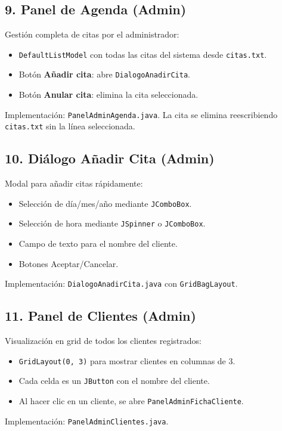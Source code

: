 \documentclass[12pt,a4paper]{report}
\begin{document}
\subsection{9. Panel de Agenda (Admin)}
Gestión completa de citas por el administrador:
\begin{itemize}
    \item \texttt{DefaultListModel} con todas las citas del sistema desde \texttt{citas.txt}.
    \item Botón \textbf{Añadir cita}: abre \texttt{DialogoAnadirCita}.
    \item Botón \textbf{Anular cita}: elimina la cita seleccionada.
\end{itemize}
Implementación: \texttt{PanelAdminAgenda.java}. La cita se elimina reescribiendo \texttt{citas.txt} sin la línea seleccionada.

\subsection{10. Diálogo Añadir Cita (Admin)}
Modal para añadir citas rápidamente:
\begin{itemize}
    \item Selección de día/mes/año mediante \texttt{JComboBox}.
    \item Selección de hora mediante \texttt{JSpinner} o \texttt{JComboBox}.
    \item Campo de texto para el nombre del cliente.
    \item Botones Aceptar/Cancelar.
\end{itemize}
Implementación: \texttt{DialogoAnadirCita.java} con \texttt{GridBagLayout}.

\subsection{11. Panel de Clientes (Admin)}
Visualización en grid de todos los clientes registrados:
\begin{itemize}
    \item \texttt{GridLayout(0, 3)} para mostrar clientes en columnas de 3.
    \item Cada celda es un \texttt{JButton} con el nombre del cliente.
    \item Al hacer clic en un cliente, se abre \texttt{PanelAdminFichaCliente}.
\end{itemize}
Implementación: \texttt{PanelAdminClientes.java}.
\end{document}
